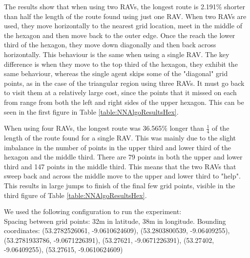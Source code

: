 The results show that when using two RAVs, the longest route is 2.191\% shorter than half the length of the route found using just one RAV. When two RAVs are used, they move horizontally to the nearest grid location, meet in the middle of the hexagon and then move back to the outer edge. Once the reach the lower third of the hexagon, they move down diagonally and then back across horizontally. This behaviour is the same when using a single RAV. The key difference is when they move to the top third of the hexagon, they exhibit the same behaviour, whereas the single agent skips some of the "diagonal" grid points, as in the case of the triangular region using three RAVs. It must go back to visit them at a relatively large cost, since the points that it missed on each from range from both the left and right sides of the upper hexagon. This can be seen in the first figure in Table \ref{table:NNAlgoResultsHex}.


When using four RAVs, the longest route was 36.565\% longer than $\frac{1}{4}$ of the length of the route found for a single RAV. This was mainly due to the slight imbalance in the number of points in the upper third and lower third of the hexagon and the middle third. There are 79 points in both the upper and lower third and 147 points in the middle third. This means that the two RAVs that sweep back and across the middle move to the upper and lower third to "help". This results in large jumps to finish of the final few grid points, visible in the third figure of Table \ref{table:NNAlgoResultsHex}. 

We used the following configuration to run the experiment:
\\
Spacing between grid points: 32m in latitude, 38m in longitude.
Bounding coordinates: (53.2782526061, -9.0610624609), (53.2803800539, -9.06409255), (53.2781933786, -9.0671226391), (53.27621, -9.0671226391), (53.27402, -9.06409255), (53.27615, -9.0610624609)





